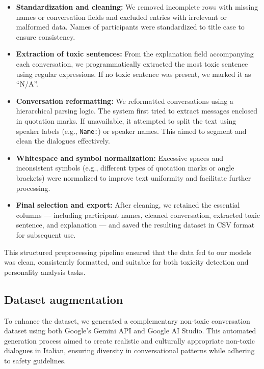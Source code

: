 \documentclass[conference]{IEEEtran}
\begin{document}
\begin{itemize}
    \item \textbf{Standardization and cleaning:} We removed incomplete rows with missing names or conversation fields and excluded entries with irrelevant or malformed data. Names of participants were standardized to title case to ensure consistency.
    
    \item \textbf{Extraction of toxic sentences:} From the explanation field accompanying each conversation, we programmatically extracted the most toxic sentence using regular expressions. If no toxic sentence was present, we marked it as ``N/A''.
    
    \item \textbf{Conversation reformatting:} We reformatted conversations using a hierarchical parsing logic. The system first tried to extract messages enclosed in quotation marks. If unavailable, it attempted to split the text using speaker labels (e.g., \texttt{Name:}) or speaker names. This aimed to segment and clean the dialogues effectively.
    
    \item \textbf{Whitespace and symbol normalization:} Excessive spaces and inconsistent symbols (e.g., different types of quotation marks or angle brackets) were normalized to improve text uniformity and facilitate further processing.
    
    \item \textbf{Final selection and export:} After cleaning, we retained the essential columns --- including participant names, cleaned conversation, extracted toxic sentence, and explanation --- and saved the resulting dataset in CSV format for subsequent use.
\end{itemize}

This structured preprocessing pipeline ensured that the data fed to our models was clean, consistently formatted, and suitable for both toxicity detection and personality analysis tasks.

\subsection{Dataset augmentation}

To enhance the dataset, we generated a complementary non-toxic conversation dataset using both Google's Gemini API and Google AI Studio. This automated generation process aimed to create realistic and culturally appropriate non-toxic dialogues in Italian, ensuring diversity in conversational patterns while adhering to safety guidelines.
\end{document}
